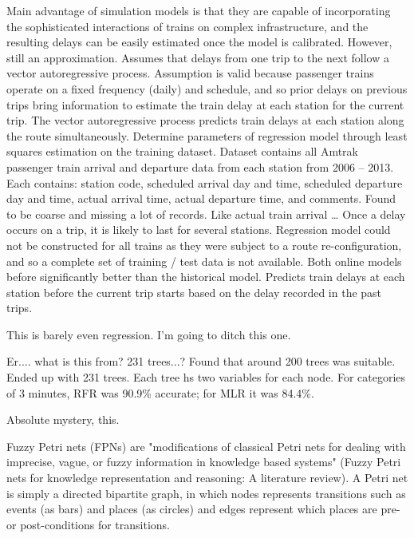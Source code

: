 \documentclass{article}
\begin{document}
Main advantage of simulation models is that they are capable of incorporating the sophisticated interactions of trains on complex infrastructure, and the resulting delays can be easily estimated once the model is calibrated. However, still an approximation.
Assumes that delays from one trip to the next follow a vector autoregressive process. Assumption is valid because passenger trains operate on a fixed frequency (daily) and schedule, and so prior delays on previous trips bring information to estimate the train delay at each station for the current trip. The vector autoregressive process predicts train delays at each station along the route simultaneously.
Determine parameters of regression model through least squares estimation on the training dataset.
Dataset contains all Amtrak passenger train arrival and departure data from each station from 2006 – 2013. Each contains: station code, scheduled arrival day and time, scheduled departure day and time, actual arrival time, actual departure time, and comments.
Found to be coarse and missing a lot of records. Like actual train arrival …
Once a delay occurs on a trip, it is likely to last for several stations. 
Regression model could not be constructed for all trains as they were subject to a route re-configuration, and so a complete set of training / test data is not available. 
Both online models before significantly better than the historical model. 
Predicts train delays at each station before the current trip starts based on the delay recorded in the past trips.

This is barely even regression. I'm going to ditch this one.

Er.... what is this from? 231 trees...? \cite{nair_et_al}
Found that around 200 trees was suitable. Ended up with 231 trees. Each tree hs two variables for each node.  For categories of 3 minutes, RFR was 90.9\% accurate; for MLR it was 84.4\%. 

Absolute mystery, this. 


Fuzzy Petri nets (FPNs) are "modifications of classical Petri nets for dealing with imprecise, vague, or fuzzy information in knowledge based systems" \cite{liu_et_al_2017} (Fuzzy Petri nets for knowledge representation and reasoning: A literature review). A Petri net is simply a directed bipartite graph, in which nodes represents transitions such as events (as bars) and places (as circles) and edges represent which places are pre- or post-conditions for transitions.
\end{document}

